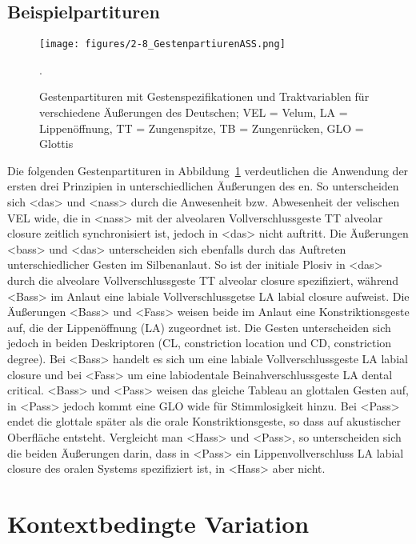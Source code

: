 \subsection{Beispielpartituren}
\label{subsec:020104}
\begin{figure}[t]
	\texttt{[image: figures/2-8\_GestenpartiurenASS.png]}
	\caption{Gestenpartituren mit Gestenspezifikationen und Traktvariablen für verschiedene Äußerungen des Deutschen; VEL = Velum, LA = Lippenöffnung, TT = Zungenspitze, TB = Zungenrücken, GLO = Glottis}.
	\label{figure:0208}
\end{figure}

Die folgenden Gestenpartituren in Abbildung~\ref{figure:0208} verdeutlichen die Anwendung der ersten drei Prinzipien in unterschiedlichen Äußerungen des en. So unterscheiden sich <das> und <nass> durch die Anwesenheit bzw. Abwesenheit der velischen  {VEL wide}, die in <nass> mit der alveolaren Vollverschlussgeste {TT alveolar closure} zeitlich synchronisiert ist, jedoch in <das> nicht auftritt. Die Äußerungen <bass> und <das> unterscheiden sich ebenfalls durch das Auftreten unterschiedlicher Gesten im Silbenanlaut. So ist der initiale Plosiv in <das> durch die alveolare Vollverschlussgeste {TT alveolar closure} spezifiziert, während <Bass> im Anlaut eine labiale Vollverschlussgetse {LA labial closure} aufweist. Die Äußerungen <Bass> und <Fass> weisen beide im Anlaut eine Konstriktionsgeste auf, die der  Lippenöffnung (LA) zugeordnet ist. Die Gesten unterscheiden sich jedoch in beiden Deskriptoren (CL, constriction location und CD, constriction degree). Bei <Bass> handelt es sich um eine labiale Vollverschlussgeste {LA labial closure} und bei <Fass> um eine labiodentale Beinahverschlussgeste {LA dental critical}. <Bass> und <Pass> weisen das gleiche Tableau an glottalen Gesten auf, in <Pass> jedoch kommt eine  {GLO wide} für Stimmlosigkeit hinzu. Bei <Pass> endet die glottale  später als die orale Konstriktionsgeste, so dass auf akustischer Oberfläche  entsteht. Vergleicht man <Hass> und <Pass>, so unterscheiden sich die beiden Äußerungen darin, dass in <Pass> ein Lippenvollverschluss {LA labial closure} des oralen Systems spezifiziert ist, in <Hass> aber nicht.  

\section{Kontextbedingte Variation}
\label{sec:0202}

